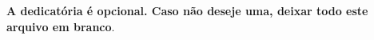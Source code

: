 \begin{dedicatoria}
   \vspace*{\fill}
   \centering
   \noindent
	\textbf{A dedicatória é opcional. Caso não deseje uma, deixar todo este
	arquivo em branco}.

   \textit{} \vspace*{\fill}
\end{dedicatoria}
